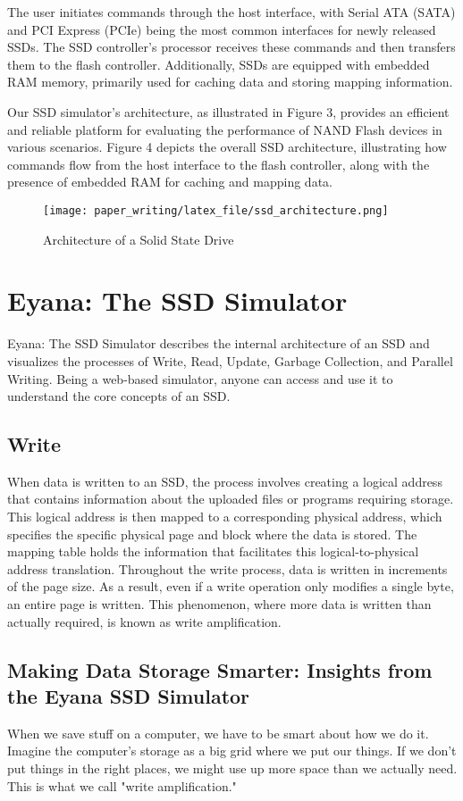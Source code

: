 \documentclass[conference]{paper_writing/latex_file/IEEEtran}
\begin{document}
The user initiates commands through the host interface, with Serial ATA (SATA) and PCI Express (PCIe) being the most common interfaces for newly released SSDs. The SSD controller's processor receives these commands and then transfers them to the flash controller. Additionally, SSDs are equipped with embedded RAM memory, primarily used for caching data and storing mapping information.

Our SSD simulator's architecture, as illustrated in Figure 3, provides an efficient and reliable platform for evaluating the performance of NAND Flash devices in various scenarios. Figure 4 depicts the overall SSD architecture, illustrating how commands flow from the host interface to the flash controller, along with the presence of embedded RAM for caching and mapping data.

\begin{figure}[h]
    \centering
    \texttt{[image: paper\_writing/latex\_file/ssd\_architecture.png]}
    \caption{Architecture of a Solid State Drive}
    \label{fig:ssd_architecture}
\end{figure}

\section{Eyana: The SSD Simulator}
Eyana: The SSD Simulator describes the internal architecture of an SSD and visualizes the processes of Write, Read, Update, Garbage Collection, and Parallel Writing. Being a web-based simulator, anyone can access and use it to understand the core concepts of an SSD.

\subsection{Write}
When data is written to an SSD, the process involves creating a logical address that contains information about the uploaded files or programs requiring storage. This logical address is then mapped to a corresponding physical address, which specifies the specific physical page and block where the data is stored. The mapping table holds the information that facilitates this logical-to-physical address translation.
Throughout the write process, data is written in increments of the page size. As a result, even if a write operation only modifies a single byte, an entire page is written. This phenomenon, where more data is written than actually required, is known as write amplification.
\subsection{Making Data Storage Smarter: Insights from the Eyana SSD Simulator}
When we save stuff on a computer, we have to be smart about how we do it. Imagine the computer's storage as a big grid where we put our things. If we don't put things in the right places, we might use up more space than we actually need. This is what we call "write amplification."
\end{document}
